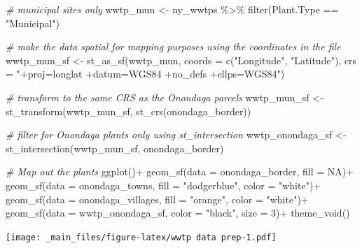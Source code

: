\documentclass[
]{book}
\newenvironment{Shaded}{\begin{snugshade}}{\end{snugshade}}
\newcommand{\AttributeTok}[1]{\textcolor[rgb]{0.77,0.63,0.00}{#1}}
\newcommand{\CommentTok}[1]{\textcolor[rgb]{0.56,0.35,0.01}{\textit{#1}}}
\newcommand{\ConstantTok}[1]{\textcolor[rgb]{0.00,0.00,0.00}{#1}}
\newcommand{\DecValTok}[1]{\textcolor[rgb]{0.00,0.00,0.81}{#1}}
\newcommand{\FunctionTok}[1]{\textcolor[rgb]{0.00,0.00,0.00}{#1}}
\newcommand{\NormalTok}[1]{#1}
\newcommand{\OtherTok}[1]{\textcolor[rgb]{0.56,0.35,0.01}{#1}}
\newcommand{\SpecialCharTok}[1]{\textcolor[rgb]{0.00,0.00,0.00}{#1}}
\newcommand{\StringTok}[1]{\textcolor[rgb]{0.31,0.60,0.02}{#1}}
\begin{document}
\begin{Shaded}
\begin{Highlighting}[]
\CommentTok{\# municipal sites only}
\NormalTok{wwtp\_mun }\OtherTok{\textless{}{-}}\NormalTok{ ny\_wwtps }\SpecialCharTok{\%\textgreater{}\%}
  \FunctionTok{filter}\NormalTok{(Plant.Type }\SpecialCharTok{==} \StringTok{"Municipal"}\NormalTok{)}

\CommentTok{\# make the data spatial for mapping purposes using the coordinates in the file}
\NormalTok{wwtp\_mun\_sf }\OtherTok{\textless{}{-}} 
  \FunctionTok{st\_as\_sf}\NormalTok{(wwtp\_mun,}
           \AttributeTok{coords =}  \FunctionTok{c}\NormalTok{(}\StringTok{"Longitude"}\NormalTok{, }\StringTok{"Latitude"}\NormalTok{),}
           \AttributeTok{crs =} \StringTok{"+proj=longlat +datum=WGS84 +no\_defs +ellps=WGS84"}\NormalTok{)}

\CommentTok{\# transform to the same CRS as the Onondaga parcels}
\NormalTok{wwtp\_mun\_sf }\OtherTok{\textless{}{-}} \FunctionTok{st\_transform}\NormalTok{(wwtp\_mun\_sf, }\FunctionTok{st\_crs}\NormalTok{(onondaga\_border))}

\CommentTok{\# filter for Onondaga plants only using st\_intersection}
\NormalTok{wwtp\_onondaga\_sf }\OtherTok{\textless{}{-}} \FunctionTok{st\_intersection}\NormalTok{(wwtp\_mun\_sf, onondaga\_border)}

\CommentTok{\# Map out the plants}
\FunctionTok{ggplot}\NormalTok{()}\SpecialCharTok{+}
  \FunctionTok{geom\_sf}\NormalTok{(}\AttributeTok{data =}\NormalTok{ onondaga\_border, }\AttributeTok{fill =} \ConstantTok{NA}\NormalTok{)}\SpecialCharTok{+}
  \FunctionTok{geom\_sf}\NormalTok{(}\AttributeTok{data =}\NormalTok{ onondaga\_towns, }\AttributeTok{fill =} \StringTok{"dodgerblue"}\NormalTok{, }\AttributeTok{color =} \StringTok{"white"}\NormalTok{)}\SpecialCharTok{+}
  \FunctionTok{geom\_sf}\NormalTok{(}\AttributeTok{data =}\NormalTok{ onondaga\_villages, }\AttributeTok{fill =} \StringTok{"orange"}\NormalTok{, }\AttributeTok{color =} \StringTok{"white"}\NormalTok{)}\SpecialCharTok{+}
  \FunctionTok{geom\_sf}\NormalTok{(}\AttributeTok{data =}\NormalTok{ wwtp\_onondaga\_sf, }\AttributeTok{color =} \StringTok{"black"}\NormalTok{, }\AttributeTok{size =} \DecValTok{3}\NormalTok{)}\SpecialCharTok{+}
  \FunctionTok{theme\_void}\NormalTok{()}
\end{Highlighting}
\end{Shaded}

\texttt{[image: \_main\_files/figure-latex/wwtp data prep-1.pdf]}
\end{document}
